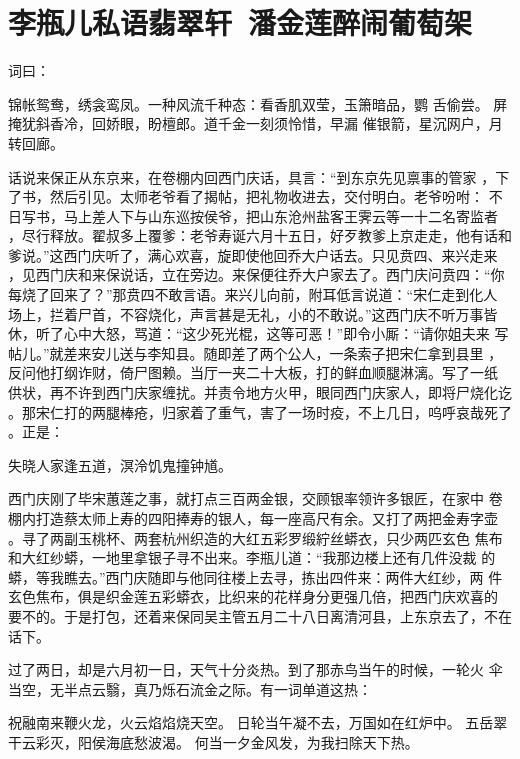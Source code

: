 \chapter{李瓶儿私语翡翠轩~潘金莲醉闹葡萄架}

词曰：

锦帐鸳鸯，绣衾鸾凤。一种风流千种态：看香肌双莹，玉箫暗品，鹦
舌偷尝。  屏掩犹斜香冷，回娇眼，盼檀郎。道千金一刻须怜惜，早漏
催银箭，星沉网户，月转回廊。

话说来保正从东京来，在卷棚内回西门庆话，具言：“到东京先见禀事的管家
，下了书，然后引见。太师老爷看了揭帖，把礼物收进去，交付明白。老爷吩咐：
不日写书，马上差人下与山东巡按侯爷，把山东沧州盐客王霁云等一十二名寄监者
，尽行释放。翟叔多上覆爹：老爷寿诞六月十五日，好歹教爹上京走走，他有话和
爹说。”这西门庆听了，满心欢喜，旋即使他回乔大户话去。只见贲四、来兴走来
，见西门庆和来保说话，立在旁边。来保便往乔大户家去了。西门庆问贲四：“你
每烧了回来了？”那贲四不敢言语。来兴儿向前，附耳低言说道：“宋仁走到化人
场上，拦着尸首，不容烧化，声言甚是无礼，小的不敢说。”这西门庆不听万事皆
休，听了心中大怒，骂道：“这少死光棍，这等可恶！”即令小厮：“请你姐夫来
写帖儿。”就差来安儿送与李知县。随即差了两个公人，一条索子把宋仁拿到县里
，反问他打纲诈财，倚尸图赖。当厅一夹二十大板，打的鲜血顺腿淋漓。写了一纸
供状，再不许到西门庆家缠扰。并责令地方火甲，眼同西门庆家人，即将尸烧化讫
。那宋仁打的两腿棒疮，归家着了重气，害了一场时疫，不上几日，呜呼哀哉死了
。正是：

失晓人家逢五道，溟泠饥鬼撞钟馗。

西门庆刚了毕宋蕙莲之事，就打点三百两金银，交顾银率领许多银匠，在家中
卷棚内打造蔡太师上寿的四阳捧寿的银人，每一座高尺有余。又打了两把金寿字壶
。寻了两副玉桃杯、两套杭州织造的大红五彩罗缎紵丝蟒衣，只少两匹玄色
焦布和大红纱蟒，一地里拿银子寻不出来。李瓶儿道：“我那边楼上还有几件没裁
的蟒，等我瞧去。”西门庆随即与他同往楼上去寻，拣出四件来：两件大红纱，两
件玄色焦布，俱是织金莲五彩蟒衣，比织来的花样身分更强几倍，把西门庆欢喜的
要不的。于是打包，还着来保同吴主管五月二十八日离清河县，上东京去了，不在
话下。

过了两日，却是六月初一日，天气十分炎热。到了那赤鸟当午的时候，一轮火
伞当空，无半点云翳，真乃烁石流金之际。有一词单道这热：

祝融南来鞭火龙，火云焰焰烧天空。
日轮当午凝不去，万国如在红炉中。
五岳翠干云彩灭，阳侯海底愁波渴。
何当一夕金风发，为我扫除天下热。

